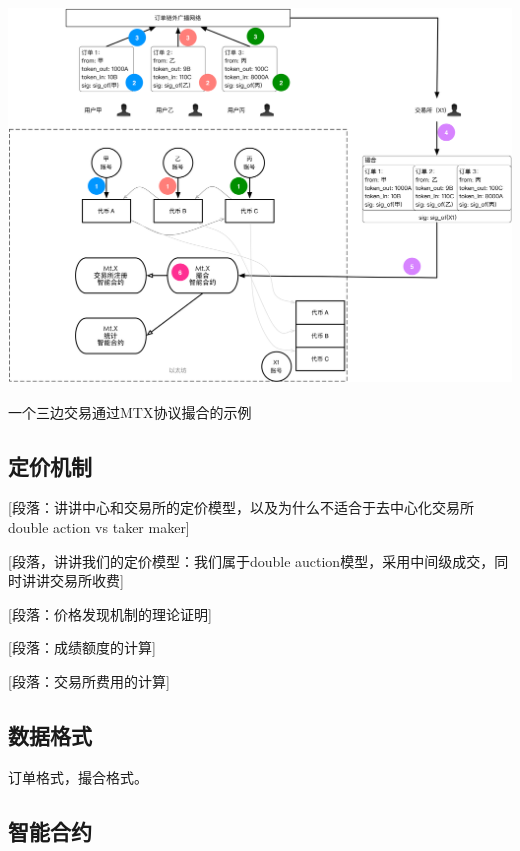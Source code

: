 \documentclass[UTF8,nofonts]{ctexart}
\makeatletter
\newenvironment{figurehere}
  {\def\@captype{figure}}
  {}
\makeatother
\begin{document}
\begin{center}
\begin{figurehere}
\includegraphics[height=10cm]{images/mtx-protocol.png}
\caption{一个三边交易通过MTX协议撮合的示例}
\label{fig:mtxprotocol}
\end{figurehere}
\end{center}



\subsection{定价机制\label{sec:pricediscovery}}

[段落：讲讲中心和交易所的定价模型，以及为什么不适合于去中心化交易所 double action vs taker maker]

[段落，讲讲我们的定价模型：我们属于double auction模型，采用中间级成交，同时讲讲交易所收费]

[段落：价格发现机制的理论证明]

[段落：成绩额度的计算]

[段落：交易所费用的计算]

\subsection{数据格式\label{sec:dataformat}}

订单格式，撮合格式。

\subsection{智能合约\label{sec:smartcontract}}
\end{document}
